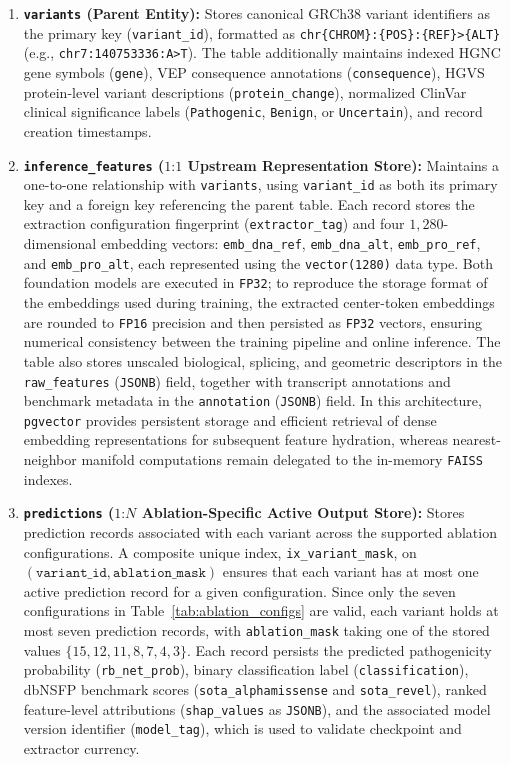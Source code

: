 \begin{enumerate}
    \item \textbf{\texttt{variants} (Parent Entity):} Stores canonical GRCh38 variant identifiers as the primary key (\texttt{variant\_id}), formatted as \texttt{chr\{CHROM\}:\{POS\}:\{REF\}>\{ALT\}} (e.g., \texttt{chr7:140753336:A>T}). The table additionally maintains indexed HGNC gene symbols (\texttt{gene}), VEP consequence annotations (\texttt{consequence}), HGVS protein-level variant descriptions (\texttt{protein\_change}), normalized ClinVar clinical significance labels (\texttt{Pathogenic}, \texttt{Benign}, or \texttt{Uncertain}), and record creation timestamps.

    \item \textbf{\texttt{inference\_features} ($1\text{:}1$ Upstream Representation Store):} Maintains a one-to-one relationship with \texttt{variants}, using \texttt{variant\_id} as both its primary key and a foreign key referencing the parent table. Each record stores the extraction configuration fingerprint (\texttt{extractor\_tag}) and four $1{,}280$-dimensional embedding vectors: \texttt{emb\_dna\_ref}, \texttt{emb\_dna\_alt}, \texttt{emb\_pro\_ref}, and \texttt{emb\_pro\_alt}, each represented using the \texttt{vector(1280)} data type. Both foundation models are executed in \texttt{FP32}; to reproduce the storage format of the embeddings used during training, the extracted center-token embeddings are rounded to \texttt{FP16} precision and then persisted as \texttt{FP32} vectors, ensuring numerical consistency between the training pipeline and online inference. The table also stores unscaled biological, splicing, and geometric descriptors in the \texttt{raw\_features} (\texttt{JSONB}) field, together with transcript annotations and benchmark metadata in the \texttt{annotation} (\texttt{JSONB}) field. In this architecture, \texttt{pgvector} provides persistent storage and efficient retrieval of dense embedding representations for subsequent feature hydration, whereas nearest-neighbor manifold computations remain delegated to the in-memory \texttt{FAISS} indexes.

    \item \textbf{\texttt{predictions} ($1\text{:}N$ Ablation-Specific Active Output Store):} Stores prediction records associated with each variant across the supported ablation configurations. A composite unique index, \texttt{ix\_variant\_mask}, on $(\texttt{variant\_id}, \texttt{ablation\_mask})$ ensures that each variant has at most one active prediction record for a given configuration. Since only the seven configurations in Table~\ref{tab:ablation_configs} are valid, each variant holds at most seven prediction records, with \texttt{ablation\_mask} taking one of the stored values $\{15, 12, 11, 8, 7, 4, 3\}$. Each record persists the predicted pathogenicity probability (\texttt{rb\_net\_prob}), binary classification label (\texttt{classification}), dbNSFP benchmark scores (\texttt{sota\_alphamissense} and \texttt{sota\_revel}), ranked feature-level attributions (\texttt{shap\_values} as \texttt{JSONB}), and the associated model version identifier (\texttt{model\_tag}), which is used to validate checkpoint and extractor currency.
\end{enumerate}

